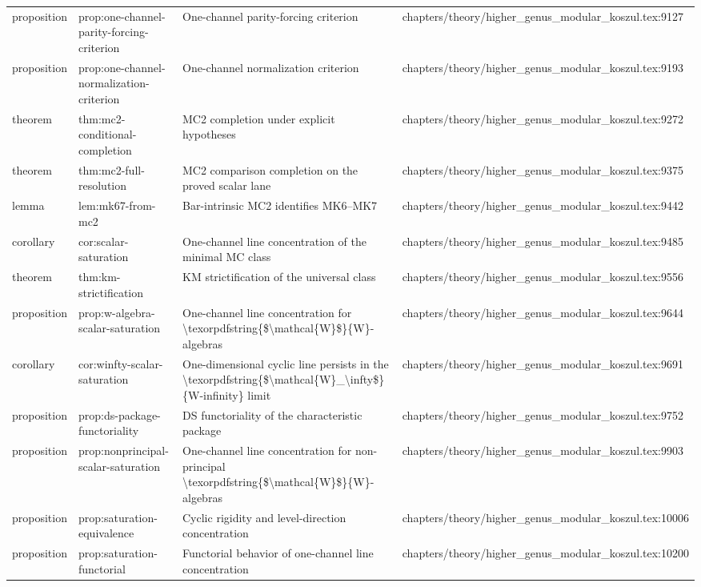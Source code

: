 \documentclass[11pt]{article}
\begin{document}
\begin{longtable}{L{0.10\textwidth}L{0.26\textwidth}L{0.42\textwidth}L{0.22\textwidth}}
proposition & prop:one-channel-parity-forcing-criterion & One-channel parity-forcing criterion & chapters/theory/higher\_genus\_modular\_koszul.tex:9127\\
proposition & prop:one-channel-normalization-criterion & One-channel normalization criterion & chapters/theory/higher\_genus\_modular\_koszul.tex:9193\\
theorem & thm:mc2-cond{}itional-completion & MC2 completion under explicit hypotheses & chapters/theory/higher\_genus\_modular\_koszul.tex:9272\\
theorem & thm:mc2-full-resolution & MC2 comparison completion on the proved scalar lane & chapters/theory/higher\_genus\_modular\_koszul.tex:9375\\
lemma & lem:mk67-from-mc2 & Bar-intrinsic MC2 identifies MK6--MK7 & chapters/theory/higher\_genus\_modular\_koszul.tex:9442\\
corollary & cor:scalar-saturation & One-channel line concentration of the minimal MC class & chapters/theory/higher\_genus\_modular\_koszul.tex:9485\\
theorem & thm:km-strictification & KM strictification of the universal class & chapters/theory/higher\_genus\_modular\_koszul.tex:9556\\
proposition & prop:w-algebra-scalar-saturation & One-channel line concentration for \textbackslash{}texorpdfstring\{\$\textbackslash{}mathcal\{W\}\$\}\{W\}-algebras & chapters/theory/higher\_genus\_modular\_koszul.tex:9644\\
corollary & cor:winfty-scalar-saturation & One-dimensional cyclic line persists in the \textbackslash{}texorpdfstring\{\$\textbackslash{}mathcal\{W\}\_\textbackslash{}infty\$\}\{W-infinity\} limit & chapters/theory/higher\_genus\_modular\_koszul.tex:9691\\
proposition & prop:ds-package-functoriality & DS functoriality of the characteristic package & chapters/theory/higher\_genus\_modular\_koszul.tex:9752\\
proposition & prop:nonprincipal-scalar-saturation & One-channel line concentration for non-principal \textbackslash{}texorpdfstring\{\$\textbackslash{}mathcal\{W\}\$\}\{W\}-algebras & chapters/theory/higher\_genus\_modular\_koszul.tex:9903\\
proposition & prop:saturation-equivalence & Cyclic rigidity and level-direction concentration & chapters/theory/higher\_genus\_modular\_koszul.tex:10006\\
proposition & prop:saturation-functorial & Functorial behavior of one-channel line concentration & chapters/theory/higher\_genus\_modular\_koszul.tex:10200\\

\end{longtable}
\end{document}
